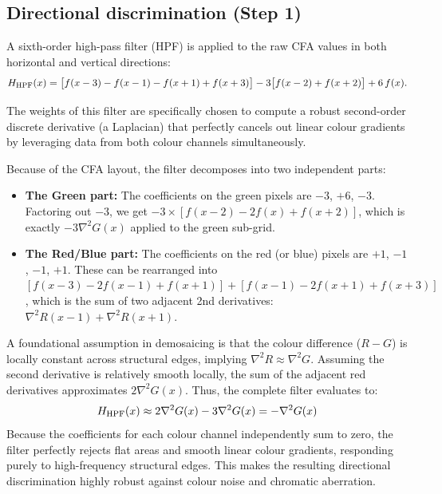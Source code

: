 \documentclass[a4paper,11pt]{article}
\newcommand{\tile}[6][]{%
  \if#4r\def\tilecol{cfared}\else
    \if#4g\def\tilecol{cfagreen}\else
      \if#4b\def\tilecol{cfablue}\else
        \def\tilecol{cfagrey}\fi\fi\fi
  \node[cfa-tile, fill=\tilecol!60, #1] (T#2#3) at (#2*0.8, -#3*0.8) {};
  \ifx&#5&\else\node[cfa-coords, above=0pt of T#2#3] {#5};\fi
  \ifx&#6&\else\node[cfa-weight] at (T#2#3) {#6};\fi
}
\begin{document}
\subsection{Directional discrimination (Step 1)}
A sixth-order high-pass filter (HPF) is applied to the raw CFA values
in both horizontal and vertical directions:
\[
  H_{\rm HPF}(x) = \bigl[f(x-3)-f(x-1)-f(x+1)+f(x+3)\bigr]
                   - 3\bigl[f(x-2)+f(x+2)\bigr] + 6\,f(x).
\]

\begin{center}
\end{center}

The weights of this filter are specifically chosen to compute a robust second-order discrete derivative (a Laplacian) that perfectly cancels out linear colour gradients by leveraging data from both colour channels simultaneously. 

Because of the CFA layout, the filter decomposes into two independent parts:
\begin{itemize}
    \item \textbf{The Green part:} The coefficients on the green pixels are $-3$, $+6$, $-3$. Factoring out $-3$, we get $-3 \times [f(x-2) - 2f(x) + f(x+2)]$, which is exactly $-3 \nabla^2 G(x)$ applied to the green sub-grid.
    \item \textbf{The Red/Blue part:} The coefficients on the red (or blue) pixels are $+1$, $-1$, $-1$, $+1$. These can be rearranged into $[f(x-3) - 2f(x-1) + f(x+1)] + [f(x-1) - 2f(x+1) + f(x+3)]$, which is the sum of two adjacent 2nd derivatives: $\nabla^2 R(x-1) + \nabla^2 R(x+1)$.
\end{itemize}

A foundational assumption in demosaicing is that the colour difference ($R - G$) is locally constant across structural edges, implying $\nabla^2 R \approx \nabla^2 G$. Assuming the second derivative is relatively smooth locally, the sum of the adjacent red derivatives approximates $2 \nabla^2 G(x)$. Thus, the complete filter evaluates to:
\[
    H_{\rm HPF}(x) \approx 2 \nabla^2 G(x) - 3 \nabla^2 G(x) = -\nabla^2 G(x)
\]
Because the coefficients for each colour channel independently sum to zero, the filter perfectly rejects flat areas and smooth linear colour gradients, responding purely to high-frequency structural edges. This makes the resulting directional discrimination highly robust against colour noise and chromatic aberration.
\end{document}
